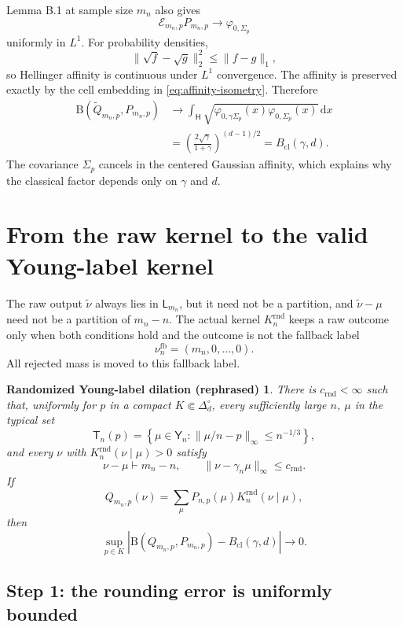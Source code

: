 \documentclass[11pt]{article}
\newcommand{\dd}{\,\mathrm d}
\newcommand{\B}{\mathrm B}
\newcommand{\Bcl}{B_{\mathrm{cl}}}
\newcommand{\htile}{\mathsf H}
\newtheorem*{propB}{Randomized Young-label dilation (rephrased)}
\begin{document}
Lemma B.1 at sample size $m_n$ also gives
\[
  \mathcal E_{m_n,p}P_{m_n,p}
  \longrightarrow\varphi_{0,\Sigma_p}
\]
uniformly in $L^1$.  For probability densities,
\[
  \|\sqrt f-\sqrt g\|_2^2\leq\|f-g\|_1,
\]
so Hellinger affinity is continuous under $L^1$ convergence.  The affinity
is preserved exactly by the cell embedding in
\eqref{eq:affinity-isometry}.  Therefore
\begin{align*}
  \B(\widetilde Q_{m_n,p},P_{m_n,p})
  &\longrightarrow
  \int_{\htile}
  \sqrt{\varphi_{0,\gamma\Sigma_p}(x)
        \varphi_{0,\Sigma_p}(x)}\dd x\\
  &=\left(\frac{2\sqrt\gamma}{1+\gamma}\right)^{(d-1)/2}
   =\Bcl(\gamma,d).
\end{align*}
The covariance $\Sigma_p$ cancels in the centered Gaussian affinity, which
explains why the classical factor depends only on $\gamma$ and $d$.

\section{From the raw kernel to the valid Young-label kernel}

The raw output $\widetilde\nu$ always lies in $\mathsf L_{m_n}$, but it need
not be a partition, and $\widetilde\nu-\mu$ need not be a partition of
$m_n-n$.  The actual kernel $K_n^{\mathrm{rnd}}$ keeps a raw outcome only
when both conditions hold and the outcome is not the fallback label
\[
  \nu_n^{\mathrm{fb}}=(m_n,0,\ldots,0).
\]
All rejected mass is moved to this fallback label.

\begin{propB}
There is $c_{\mathrm{rnd}}<\infty$ such that, uniformly for
$p$ in a compact $K\Subset\Delta_d^\circ$, every sufficiently large $n$,
$\mu$ in the typical set
\[
  \mathsf T_n(p)
  =\left\{\mu\in\mathsf Y_n:
    \|\mu/n-p\|_\infty\leq n^{-1/3}\right\},
\]
and every $\nu$ with $K_n^{\mathrm{rnd}}(\nu\mid\mu)>0$ satisfy
\[
  \nu-\mu\vdash m_n-n,
  \qquad
  \|\nu-\gamma_n\mu\|_\infty\leq c_{\mathrm{rnd}}.
\]
If
\[
  Q_{m_n,p}(\nu)
  =\sum_\mu P_{n,p}(\mu)K_n^{\mathrm{rnd}}(\nu\mid\mu),
\]
then
\[
  \sup_{p\in K}
  |\B(Q_{m_n,p},P_{m_n,p})-\Bcl(\gamma,d)|
  \longrightarrow0.
\]
\end{propB}

\subsection*{Step 1: the rounding error is uniformly bounded}
\end{document}
